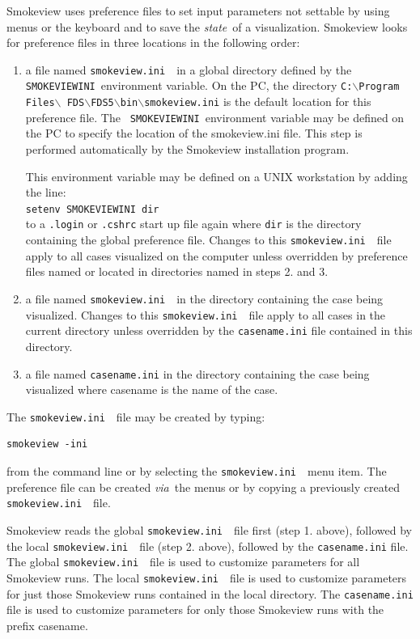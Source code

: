 \documentclass[11pt,twoside]{book}
\newcommand{\svini}{{\tt smokeview.ini}\ }
\begin{document}
Smokeview uses preference files to set input parameters not
settable by using menus or the keyboard and to save the {\em
state}\ of a visualization. Smokeview looks for preference files
in three locations in the following order:
\begin{enumerate}

\item a file named \svini\ in a global directory defined by the
{\tt SMOKEVIEWINI}\ environment variable. On the PC, the directory
{\tt C:$\backslash$Program Files$\backslash$
FDS$\backslash$FDS5$\backslash$bin$\backslash$smokeview.ini} is
the default location for this preference file. The {\tt
SMOKEVIEWINI}\ environment variable may be defined on the PC to
specify the location of the smokeview.ini file. This step is
performed automatically by the Smokeview installation program.

This environment variable may be
defined on a UNIX workstation by adding the line:\\

{\tt setenv SMOKEVIEWINI dir} \\

to a {\tt .login}  or {\tt .cshrc} start up file
again where {\tt dir} is the directory containing the
global preference file. Changes to this \svini\
file apply to all cases visualized on the computer unless
overridden by preference files named or located in
directories named in steps 2. and  3.

\item a file named \svini\ in the directory
containing the case being visualized.  Changes to this \svini\ file apply to all cases in the current
directory unless overridden by the {\tt casename.ini} file
contained in this directory.

\item a file named {\tt casename.ini} in the directory containing the case being
visualized where casename is the name of the case.
\end{enumerate}

The \svini\ file may be created by typing:
\begin{lstlisting}
smokeview -ini
\end{lstlisting}
\noindent from the command line or by selecting the \svini\ menu item. The 
preference file can be created {\em via}\ the menus or by copying a
previously created \svini\ file.

Smokeview reads the global \svini\ file first (step 1. above),
followed by the local \svini\ file (step 2. above), followed by
the {\tt casename.ini} file. The global \svini\ file is used to
customize parameters for all Smokeview runs. The local \svini\
file is used to customize parameters for just those Smokeview runs
contained in the local directory. The {\tt casename.ini} file is
used to customize parameters for only those Smokeview runs with
the prefix casename.
\end{document}
